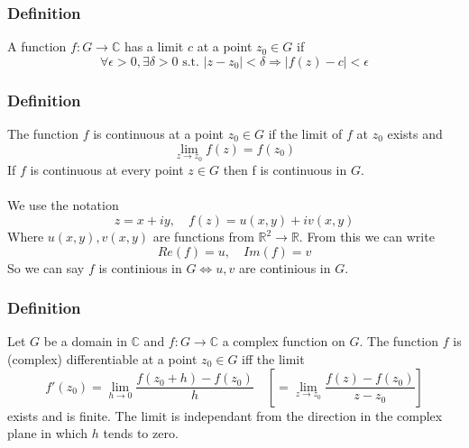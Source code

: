 \documentclass[a4paper, 12pt, twoside]{article}
\begin{document}
                \subsubsection{Definition}
                    A function $f:G \to  \mathbb{C}$ has a limit $c$ at a point $z_{0}\in G$ if
                    $$\forall\epsilon>0,\exists\delta>0\text{ s.t. } |z-z_{0}|<\delta \Rightarrow |f(z)-c|<\epsilon$$
                \subsubsection{Definition}
                    The function $f$ is continuous at a point $z_{0}\in G$ if the limit of $f$ at $z_{0}$ exists and
                    $$ \lim_{z\to z_{0}}f(z)=f(z_{0})$$
                    If $f$ is continuous at every point $z\in G$ then f is continuous in $G$.\\\\
                    We use the notation
                    $$z = x+iy,\quad f(z)=u(x,y)+iv(x,y) $$
                    Where $u(x,y),v(x,y)$ are functions from $\mathbb{R}^{2}\to \mathbb{R}$. From this we can write
                    $$ Re(f)=u,\quad Im(f)=v$$
                    So we can say $f$ is continious in $G \iff u,v$ are continious in $G$.
                \subsubsection{Definition}
                    Let $G$ be a domain in $\mathbb{C}$ and $f:G \to  \mathbb{C}$ a complex function on $G$. The function $f$ is (complex) differentiable at a point $z_{0}\in G$ iff the limit
                    $$ f'(z_{0})=\lim_{h\to0}\frac{f(z_{0}+h)-f(z_{0})}{h}\quad[= \lim_{z\to z_{0}}\frac{f(z)-f(z_{0})}{z-z_{0}}]$$
                    exists and is finite.
                    The limit is independant from the direction in the complex plane in which $h$ tends to zero.
\end{document}
